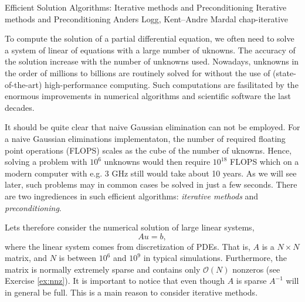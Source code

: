               {Efficient Solution Algorithms: Iterative methods and Preconditioning}
              {Iterative methods and Preconditioning} 
              {Anders Logg, Kent--Andre Mardal} 
              {chap-iterative}                          




To compute the solution of a partial differential equation, we often 
need to solve a system of linear of equations with a large number of
uknowns. The accuracy of the solution increase with 
the number of unknowns used. Nowadays,  unknowns in the order
of millions to billions are routinely solved for  without the use of (state-of-the-art) 
high-performance computing. Such computations
are fasilitated by the enormous improvements in numerical algorithms and
scientific software the last decades.        

It should be quite clear that naive Gaussian elimination can not be employed. 
For a  naive Gaussian eliminations implementaton,   
the number of required floating point operations (FLOPS) scales as the cube
of the number of uknowns. Hence, solving a problem with $10^6$ unknowns
would then require $10^{18}$ FLOPS which on a modern computer
with e.g. 3 GHz still would take about 10 years. As we will see later, 
such problems may in common cases be solved in just a few seconds.  
There are two ingrediences in such efficient algorithms: 
{\it iterative methods} and {\it preconditioning}. 

Lets therefore consider the numerical solution of large linear systems,
\[
A u =  b,
\]
where the linear system comes from discretization of PDEs. That is,  
$A$ is a $N\times N$ matrix, and $N$ is between $10^6$ and $10^9$ 
in typical simulations. Furthermore, the matrix is normally extremely sparse and contains only $\mathcal{O}(N)$ 
nonzeros (see Exercise \ref{ex:nnz}). It is important to notice that 
even though $A$ is sparse $A^{-1}$ will in general be full. 
This is a main reason to consider iterative methods. 

